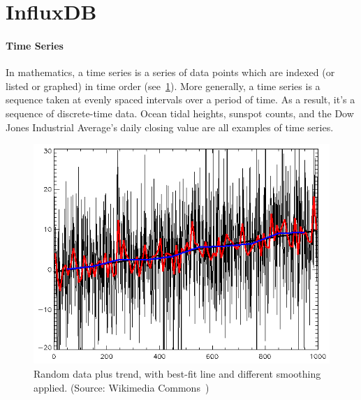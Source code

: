 \section{InfluxDB}\label{section:influxdb}
\paragraph{Time Series} In mathematics, a time series is a series of data points which are indexed (or listed or graphed) in time order (see~\ref{fig:random time-series}).
More generally, a time series is a sequence taken at evenly spaced intervals over a period of time. As a result, it's a sequence of discrete-time data.
Ocean tidal heights, sunspot counts, and the Dow Jones Industrial Average's daily closing value are all examples of time series.
\begin{figure}[ht]
    \centering
    \includegraphics[width=.9\textwidth]{content/chapter_3/images/random-data-plus-trend-r2.png}
    \caption{Random data plus trend, with best-fit line and different smoothing applied. (Source: Wikimedia Commons~\cite{file:random-data-plus-trend-r2})}
    \label{fig:random time-series}
\end{figure}
